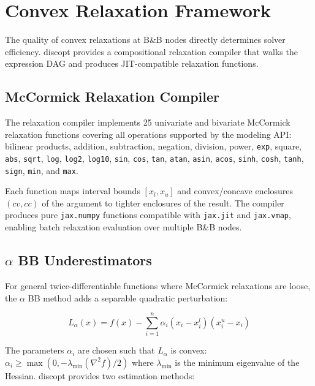 \documentclass[12pt,preprint]{article}
\begin{document}
\section{Convex Relaxation Framework}
\label{org-convex-relaxation-framework}
The quality of convex relaxations at B\&B nodes directly determines solver efficiency. discopt provides a compositional relaxation compiler that walks the expression DAG and produces JIT-compatible relaxation functions.

\subsection{McCormick Relaxation Compiler}
\label{org-mccormick-relaxation-compiler}
The relaxation compiler implements 25 univariate and bivariate McCormick relaxation functions \cite{McCormick1976,Tsoukalas2014} covering all operations supported by the modeling API: bilinear products, addition, subtraction, negation, division, power, \texttt{exp}, square, \texttt{abs}, \texttt{sqrt}, \texttt{log}, \texttt{log2}, \texttt{log10}, \texttt{sin}, \texttt{cos}, \texttt{tan}, \texttt{atan}, \texttt{asin}, \texttt{acos}, \texttt{sinh}, \texttt{cosh}, \texttt{tanh}, \texttt{sign}, \texttt{min}, and \texttt{max}.


Each function maps interval bounds $[x_l, x_u]$ and convex/concave enclosures $(cv, cc)$ of the argument to tighter enclosures of the result. The compiler produces pure \texttt{jax.numpy} functions compatible with \texttt{jax.jit} and \texttt{jax.vmap}, enabling batch relaxation evaluation over multiple B\&B nodes.

\subsection{$\alpha$ BB Underestimators}
\label{org-alpha-bb-underestimators}
For general twice-differentiable functions where McCormick relaxations are loose, the $\alpha$ BB method \cite{Androulakis1995,Adjiman1998} adds a separable quadratic perturbation:


\begin{equation}
L_{\alpha}(x) = f(x) - \sum_{i=1}^n \alpha_i (x_i - x_i^l)(x_i^u - x_i)
\end{equation}


The parameters $\alpha_i$ are chosen such that $L_\alpha$ is convex: $\alpha_i \ge \max(0, -\lambda_{\min}(\nabla^2 f) / 2)$ where $\lambda_{\min}$ is the minimum eigenvalue of the Hessian. discopt provides two estimation methods:
\end{document}
